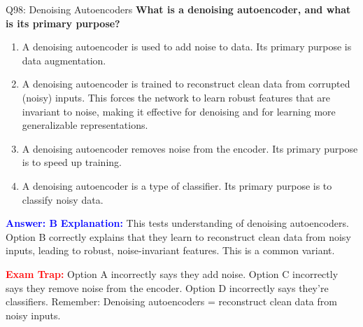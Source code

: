 \documentclass[8pt]{beamer}
\begin{document}
	\begin{frame}{Q98: Denoising Autoencoders}
		\fontsize{6.5}{7.5}\selectfont
		\textbf{What is a denoising autoencoder, and what is its primary purpose?}
		
		\begin{enumerate}
			\item A denoising autoencoder is used to add noise to data. Its primary purpose is data augmentation.
			\item A denoising autoencoder is trained to reconstruct clean data from corrupted (noisy) inputs. This forces the network to learn robust features that are invariant to noise, making it effective for denoising and for learning more generalizable representations.
			\item A denoising autoencoder removes noise from the encoder. Its primary purpose is to speed up training.
			\item A denoising autoencoder is a type of classifier. Its primary purpose is to classify noisy data.
		\end{enumerate}
		
		\vspace{0.1cm}
		\textcolor{blue}{\textbf{Answer: B}}
		\vspace{0.1cm}
		\textcolor{blue}{\textbf{Explanation:}} This tests understanding of denoising autoencoders. Option B correctly explains that they learn to reconstruct clean data from noisy inputs, leading to robust, noise-invariant features. This is a common variant.
		
		\textcolor{red}{\textbf{Exam Trap:}} Option A incorrectly says they add noise. Option C incorrectly says they remove noise from the encoder. Option D incorrectly says they're classifiers. Remember: Denoising autoencoders = reconstruct clean data from noisy inputs.
	\end{frame}
	
\end{document}
